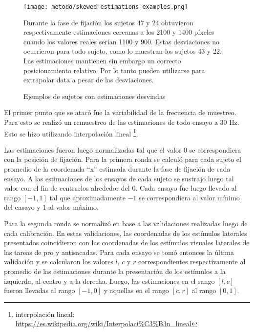   \begin{figure}
    \centering

    \texttt{[image: metodo/skewed-estimations-examples.png]}

    Durante la fase de fijación los sujetos 47 y 24 obtuvieron respectivamente
    estimaciones cercanas a los 2100 y 1400 píxeles cuando los valores reales
    serían 1100 y 900.
    Estas desviaciones no ocurrieron para todo sujeto, como lo muestran los
    sujetos 43 y 22. \\
    Las estimaciones mantienen sin embargo un correcto posicionamiento
    relativo.
    Por lo tanto pueden utilizarse para extrapolar data a pesar de las
    desviaciones.

    \caption{Ejemplos de sujetos con estimaciones desviadas}
    \label{fig:skewed-estimations-example}
  \end{figure}

  El primer punto que se atacó fue la variabilidad de la frecuencia de
  muestreo.
  Para esto se realizó un remuestreo de las estimaciones de todo ensayo a 30
  Hz.
  Esto se hizo utilizando interpolación lineal \footnote{
    interpolación lineal:
    \url{https://es.wikipedia.org/wiki/Interpolaci\%C3\%B3n\_lineal}
  }.

  Las estimaciones fueron luego normalizadas tal que el valor $0$ se
  correspondiera con la posición de fijación.
  Para la primera ronda se calculó para cada sujeto el promedio de la
  coordenada ``x'' estimada durante la fase de fijación de cada ensayo.
  A las estimaciones de los ensayos de cada sujeto se sustrajo luego tal valor
  con el fin de centrarlos alrededor del $0$.
  Cada ensayo fue luego llevado al rango $[-1, 1]$ tal que aproximadamente $-1$
  se correspondiera al valor mínimo del ensayo y $1$ al valor máximo.

  Para la segunda ronda se normalizó en base a las validaciones realizadas
  luego de cada calibración.
  En estas validaciones, las coordenadas de los estímulos laterales presentados
  coincidieron con las coordenadas de los estímulos visuales laterales de las
  tareas de pro y antisacadas.
  Para cada ensayo se tomó entonces la última validación y se calcularon los
  valores $l$, $c$ y $r$ correspondientes respectivamente al promedio de las
  estimaciones durante la presentación de los estímulos a la izquierda, al
  centro y a la derecha.
  Luego, las estimaciones en el rango $[l, c]$ fueron llevadas al rango $[-1,
  0]$ y aquellas en el rango $[c, r]$ al rango $[0, 1]$.

